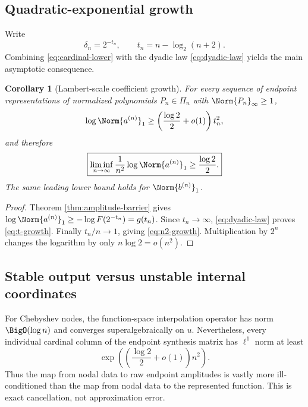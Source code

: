 \documentclass[11pt,oneside]{article}
\newtheorem{corollary}[theorem]{Corollary}
\theoremstyle{definition}
\theoremstyle{remark}
\newcommand{\1}{\mathbf{1}}
\begin{document}
\subsection{Quadratic-exponential growth}

Write
\begin{equation}
 \delta_n=2^{-t_n},
 \qquad t_n=n-\log_2(n+2).
 \label{eq:tn}
\end{equation}
Combining \eqref{eq:cardinal-lower} with the dyadic law
\eqref{eq:dyadic-law} yields the main asymptotic consequence.

\begin{corollary}[Lambert-scale coefficient growth]
\label{cor:quadratic-growth}
For every sequence of endpoint representations of normalized polynomials
$P_n\in\Pi_n$ with $\Norm{P_n}_\infty\ge1$,
\begin{equation}
 \log\Norm{a^{(n)}}_1
 \ge\left(\frac{\log2}{2}+o(1)\right)t_n^2,
 \label{eq:t-growth}
\end{equation}
and therefore
\begin{equation}
 \boxed{
 \liminf_{n\to\infty}\frac1{n^2}\log\Norm{a^{(n)}}_1
 \ge\frac{\log2}{2}.}
 \label{eq:n2-growth}
\end{equation}
The same leading lower bound holds for $\Norm{b^{(n)}}_1$.
\end{corollary}

\begin{proof}
Theorem \ref{thm:amplitude-barrier} gives
$\log\Norm{a^{(n)}}_1\ge-\log F(2^{-t_n})=g(t_n)$.
Since $t_n\to\infty$, \eqref{eq:dyadic-law} proves
\eqref{eq:t-growth}.  Finally $t_n/n\to1$, giving
\eqref{eq:n2-growth}.  Multiplication by $2^n$ changes the logarithm by only
$n\log2=o(n^2)$.
\end{proof}

\subsection{Stable output versus unstable internal coordinates}

For Chebyshev nodes, the function-space interpolation operator has norm
$\BigO(\log n)$ and converges superalgebraically on $u$.  Nevertheless, every
individual cardinal column of the endpoint synthesis matrix has
$\ell^1$ norm at least
\[
 \exp\!\left(\left(\frac{\log2}{2}+o(1)\right)n^2\right).
\]
Thus the map from nodal data to raw endpoint amplitudes is vastly more
ill-conditioned than the map from nodal data to the represented function.
This is exact cancellation, not approximation error.
\end{document}
